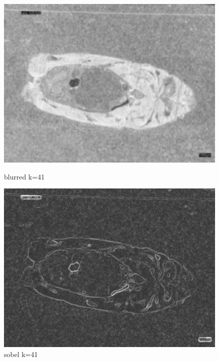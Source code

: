 \begin{figure}
    \centering
    \begin{minipage}{0.45\textwidth}
        \centering
        \includegraphics[width=\textwidth]{./fig/gausssian/blurred41.jpg}
        \caption{blurred k=41}
        \label{fig:blurred41}
    \end{minipage}
    \begin{minipage}{0.45\textwidth}
        \centering
        \includegraphics[width=\textwidth]{./fig/gausssian/sobel41.jpg}
        \caption{sobel k=41}
        \label{fig:sobel41}
    \end{minipage}
\end{figure}

